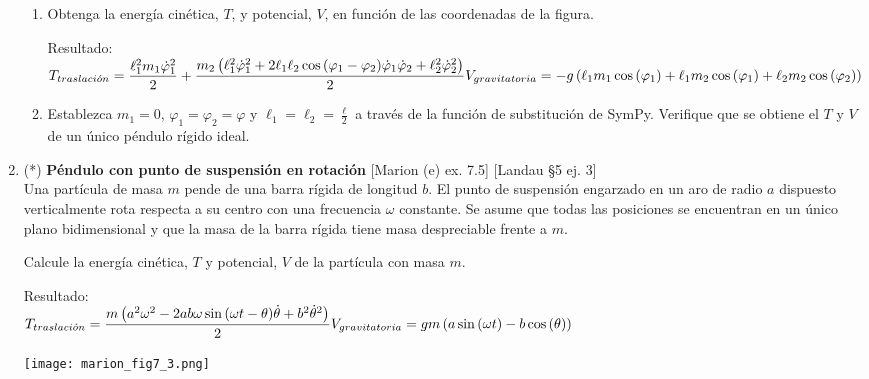 \documentclass[11pt, spanish, a4paper, twoside]{article}
\begin{document}
\begin{enumerate}
	\begin{enumerate}
		\item Obtenga la energía cinética, \(T\), y potencial, \(V\), en función de las coordenadas de la figura.
		
		Resultado:\\
		\(
			T_{traslaci\acute{o}n} = \dfrac{\ell_{1}^{2} m_{1} \dot{\varphi}_{1}^{2}}{2} + \dfrac{m_{2} \left(\ell_{1}^{2} \dot{\varphi}_{1}^{2} + 2 \ell_{1} \ell_{2} \cos{\left(\varphi_{1} - \varphi_{2} \right)} \dot{\varphi}_{1} \dot{\varphi}_{2} + \ell_{2}^{2} \dot{\varphi}_{2}^{2}\right)}{2}\\
			V_{gravitatoria} = - g \left(\ell_{1} m_{1} \cos{\left(\varphi_{1} \right)} + \ell_{1} m_{2} \cos{\left(\varphi_{1} \right)} + \ell_{2} m_{2} \cos{\left(\varphi_{2} \right)}\right)
		\)
		\item Establezca \(m_1 = 0\), \(\varphi_1 = \varphi_2 = \varphi\) y \(\ell_1 = \ell_2 = \frac{\ell}{2}\) a través de la función de substitución de SymPy. Verifique que se obtiene el \(T\) y \(V\) de un único péndulo rígido ideal.
	\end{enumerate}



\item
	\begin{minipage}[t][7.1cm]{0.55\textwidth}
		(*) \textbf{Péndulo con punto de suspensión en rotación} [Marion (e) ex. 7.5] [Landau \S5 ej. 3]\\

		Una partícula de masa \(m\) pende de una barra rígida de longitud \(b\).
		El punto de suspensión engarzado en un aro de radio \(a\) dispuesto verticalmente rota respecta a su centro con una frecuencia \(\omega\) constante.
		Se asume que todas las posiciones se encuentran en un único plano bidimensional y que la masa de la barra rígida tiene masa despreciable frente a \(m\).

		Calcule la energía cinética, \(T\) y potencial, \(V\) de la partícula con masa \(m\).

		Resultado:\\
		\(
			T_{traslaci\acute{o}n} = \dfrac{m \left(a^{2} \omega^{2} - 2 a b \omega \sin{\left(\omega t - \theta \right)} \dot{\theta} + b^{2} \dot{\theta}^{2}\right)}{2}\\
			V_{gravitatoria} = g m \left(a \sin{\left(\omega t \right)} - b \cos{\left(\theta \right)}\right)
		\)
	\end{minipage}
	\begin{minipage}[c][1.5cm][t]{0.5\textwidth}
		\texttt{[image: marion\_fig7\_3.png]}
	\end{minipage}




\end{enumerate}
\end{document}
